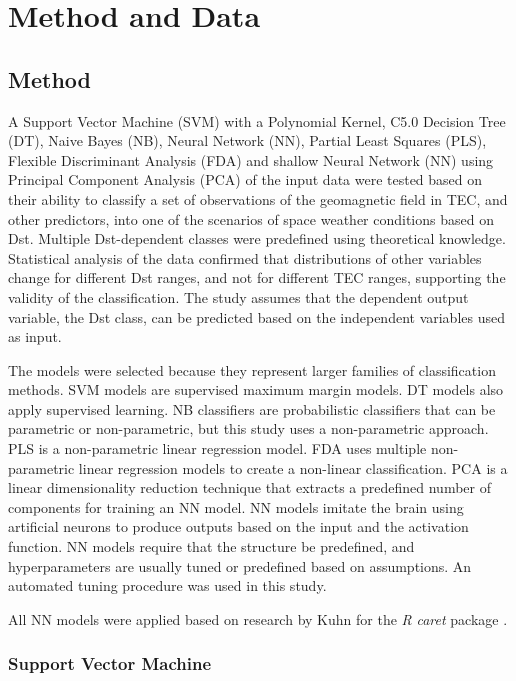 \documentclass[sn-mathphys-num]{sn-jnl}%
\begin{document}
\section{Method and Data}
\label{sec:Dataset}

\subsection{Method}

A Support Vector Machine (SVM) with a Polynomial Kernel, C5.0 Decision Tree (DT), Naive Bayes (NB), Neural Network (NN), Partial Least Squares (PLS), Flexible Discriminant Analysis (FDA) and shallow Neural Network (NN) using Principal Component Analysis (PCA) of the input data were tested based on their ability to classify a set of observations of the geomagnetic field in TEC, and other predictors, into one of the scenarios of space weather conditions based on Dst. Multiple Dst-dependent classes were predefined using theoretical knowledge. Statistical analysis of the data confirmed that distributions of other variables change for different Dst ranges, and not for different TEC ranges, supporting the validity of the classification. The study assumes that the dependent output variable, the Dst class, can be predicted based on the independent variables used as input.

The models were selected because they represent larger families of classification methods. SVM models are supervised maximum margin models. DT models also apply supervised learning. NB classifiers are probabilistic classifiers that can be parametric or non-parametric, but this study uses a non-parametric approach. PLS is a non-parametric linear regression model. FDA uses multiple non-parametric linear regression models to create a non-linear classification. PCA is a linear dimensionality reduction technique that extracts a predefined number of components for training an NN model. NN models imitate the brain using artificial neurons to produce outputs based on the input and the activation function. NN models require that the structure be predefined, and hyperparameters are usually tuned or predefined based on assumptions. An automated tuning procedure was used in this study.

All NN models were applied based on research by Kuhn for the \textit{R} \textit{caret} package \cite{kuhn2013applied, KuhnCaret2024, rprojectProjectStatistical}.

\subsubsection{Support Vector Machine}
\end{document}
